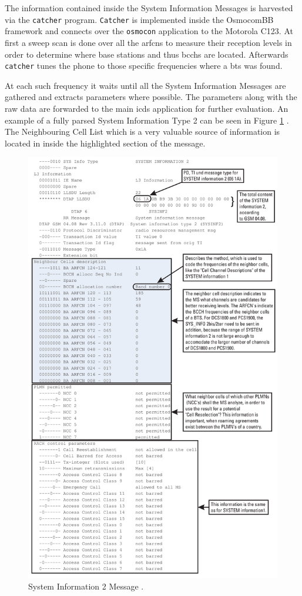 The information contained inside the System Information Messages is harvested via the \texttt{catcher} program.
\texttt{Catcher} is implemented inside the OsmocomBB framework and connects over the \texttt{osmocon} application to the Motorola C123.
At first a sweep scan is done over all the \glspl{arfcn} to measure their reception levels in order to determine where base stations and thus \glspl{bcch} are located.
Afterwards \texttt{catcher} tunes the phone to those specific frequencies where a \gls{bts} was found.

At each such frequency it waits until all the System Information Messages are gathered and extracts parameters where possible.
The parameters along with the raw data are forwarded to the main \gls{icds} application for further evaluation.
An example of a fully parsed System Information Type 2 can be seen in Figure \ref{fig:si1} \cite{protocols1999}.
The Neighbouring Cell List which is a very valuable source of information is located in inside the highlighted section of the message.
\begin{figure}
\centering
\includegraphics[width=.8\textwidth]{../Images/sysinfo2marked}
\caption{System Information 2 Message \cite{protocols1999}.}
\label{fig:si1}
\end{figure}
